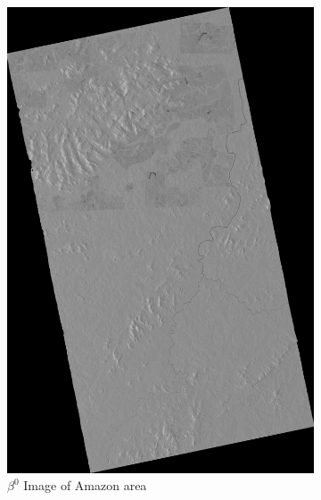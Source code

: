 \begin{figure}[H]
  \centering
    \begin{subfigure}[b]{0.4\linewidth}
      \includegraphics[width=0.8\linewidth]{Chapter4/coSSC_master_beta0.png}
      \caption{$\beta^0$ Image of Amazon area}
    \end{subfigure}
    \begin{subfigure}[b]{0.4\linewidth}

\end{subfigure}
\end{figure}
